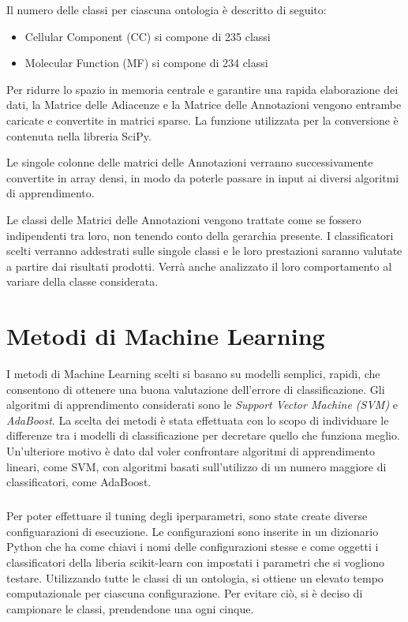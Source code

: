 \documentclass[12pt,a4paper,oneside,hidelinks]{report}
\begin{document}
Il numero delle classi per ciascuna ontologia è descritto di seguito:

\begin{itemize}
    \item Cellular Component (CC) si compone di 235 classi
    \item Molecular Function (MF) si compone di 234 classi
\end{itemize}
  
Per ridurre lo spazio in memoria centrale e garantire una rapida elaborazione dei dati, la Matrice delle Adiacenze e la Matrice delle Annotazioni vengono entrambe caricate e convertite in matrici sparse. La funzione utilizzata per la conversione è contenuta nella libreria SciPy.

Le singole colonne delle matrici delle Annotazioni verranno successivamente convertite in array densi, in modo da poterle passare in input ai diversi algoritmi di apprendimento. 

Le classi delle Matrici delle Annotazioni vengono trattate come se fossero indipendenti tra loro, non tenendo conto della gerarchia presente. I classificatori scelti verranno addestrati sulle singole classi e le loro prestazioni saranno valutate a partire dai risultati prodotti. Verrà anche analizzato il loro comportamento al variare della classe considerata.

\chapter{Metodi di Machine Learning} 
\label{chap:metodi}

I metodi di Machine Learning scelti si basano su modelli semplici, rapidi, che consentono di ottenere una buona valutazione dell'errore di classificazione. Gli algoritmi di apprendimento considerati sono le \textit{Support Vector Machine (SVM)} e \textit{AdaBoost}. La scelta dei metodi è stata effettuata con lo scopo di individuare le differenze tra i modelli di classificazione per decretare quello che funziona meglio. Un'ulteriore motivo è dato dal voler confrontare algoritmi di apprendimento lineari, come SVM, con algoritmi basati sull'utilizzo di un numero maggiore di classificatori, come AdaBoost.

\paragraph*{}
Per poter effettuare il tuning degli iperparametri, sono state create diverse configuarazioni di esecuzione.
Le configurazioni sono inserite in un dizionario Python che ha come chiavi i nomi delle configurazioni stesse e come oggetti i classificatori della liberia scikit-learn con impostati i parametri che si vogliono testare.
Utilizzando tutte le classi di un ontologia, si ottiene un elevato tempo computazionale per ciascuna configurazione. Per evitare ciò, si è deciso di campionare le classi, prendendone una ogni cinque.
 
\end{document}

